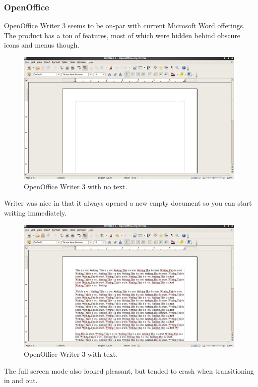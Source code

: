 \documentclass[10pt]{article}
\begin{document}
\subsubsection{OpenOffice}

OpenOffice Writer 3 seems to be on-par with current Microsoft Word offerings. The product has a ton of features, most of which were hidden behind obscure icons and menus though.

\begin{figure}
   \centering
      \includegraphics[width=130mm]{images/oo1.png}
   \caption{OpenOffice Writer 3 with no text.}
\end{figure}

Writer was nice in that it always opened a new empty document so you can start writing immediately.

\begin{figure}
   \centering
      \includegraphics[width=130mm]{images/oo2.png}
   \caption{OpenOffice Writer 3 with text.}
\end{figure}

The full screen mode also looked pleasant, but tended to crash when transitioning in and out.
\end{document}
